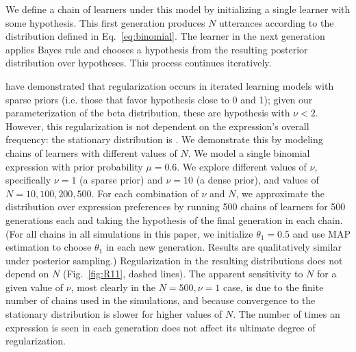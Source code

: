 \documentclass{evolang11}
\begin{document}

We define a chain of learners under this model by initializing a single learner with some hypothesis. This first generation produces $N$ utterances according to the distribution defined in Eq.\ \ref{eq:binomial}. The learner in the next generation applies Bayes rule and chooses a hypothesis from the resulting posterior distribution over hypotheses. This process continues iteratively.

 have demonstrated that regularization occurs in iterated learning models with sparse priors (i.e. those that favor hypothesis close to 0 and 1); given our parameterization of the beta distribution, these are hypothesis with $\nu<2$. However, this regularization is not dependent on the expression's overall frequency: the stationary distribution is . We demonstrate this by modeling chains of learners with different values of $N$. We model a single binomial expression with prior probability $\mu=0.6$. We explore different values of $\nu$, specifically $\nu=1$ (a sparse prior) and $\nu=10$ (a dense prior), and values of $N=10,100,200,500$. For each combination of $\nu$ and $N$, we approximate the distribution over expression preferences by running 500 chains of learners for 500 generations each and taking the hypothesis of the final generation in each chain. (For all chains in all simulations in this paper, we initialize $\theta_1=0.5$ and use MAP estimation to choose $\theta_1$ in each new generation. Results are qualitatively similar under posterior sampling.)  Regularization in the resulting distributions does not depend on $N$ (Fig.\ \ref{fig:R11}, dashed lines). The apparent sensitivity to $N$ for a given value of $\nu$, most clearly in the $N=500, \nu=1$ case, is due to the finite number of chains used in the simulations, and because convergence to the stationary distribution is slower for higher values of $N$. The number of times an expression is seen in each generation does not affect its ultimate degree of regularization.
\end{document}
